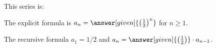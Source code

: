 \documentclass{ximera}
\begin{document}
\begin{exercise}
This series is:
\begin{multipleChoice}
\end{multipleChoice}

\begin{exercise}
The explicit formula is $a_n = \answer[given]{\left(\frac{1}{2}\right)^{n}}$ for $n \geq 1$. 
\end{exercise}

\begin{exercise}
The recursive formula $a_1 = 1/2$ and $a_n =
    \answer[given]{\left(\frac{1}{2}\right)}\cdot a_{n-1}$.
\end{exercise}

\end{exercise}
\end{document}
